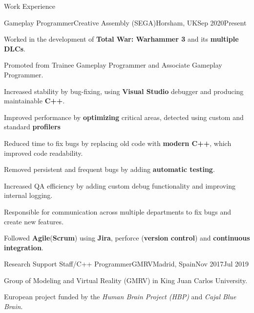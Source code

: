 \documentclass{resume} %
\begin{document}
\begin{mainSection}{Work Experience}
\begin{multiWorkExperience}
{Gameplay Programmer}{Creative Assembly (SEGA)}{Horsham, UK}{Sep 2020}{Present}
\item Worked in the development of \textbf{Total War: Warhammer 3} and its \textbf{multiple DLCs}.

\item Promoted from Trainee Gameplay Programmer and Associate Gameplay Programmer.

\item Increased stability by bug-fixing, using \textbf{Visual Studio} debugger and producing maintainable \textbf{C++}.

\item Improved performance by \textbf{optimizing} critical areas, detected using custom and standard \textbf{profilers}

\item Reduced time to fix bugs by replacing old code with \textbf{modern C++}, which improved code readability.

\item Removed persistent and frequent bugs by adding \textbf{automatic testing}.

\item Increased QA efficiency by adding custom debug functionality and improving internal logging.

\item Responsible for communication across multiple departments to fix bugs and create new features.

\item Followed \textbf{Agile}(\textbf{Scrum}) using \textbf{Jira}, perforce (\textbf{version control}) and \textbf{continuous integration}.
\end{multiWorkExperience}
\begin{multiWorkExperience}
{Research Support Staff/C++ Programmer}{GMRV}{Madrid, Spain}{Nov 2017}{Jul 2019}

\item Group of Modeling and Virtual Reality (GMRV) in King Juan Carlos University.

\item European project funded by the \textit{Human Brain Project (HBP)} and \textit{Cajal Blue Brain}.


\end{multiWorkExperience}
\end{mainSection}
\end{document}
